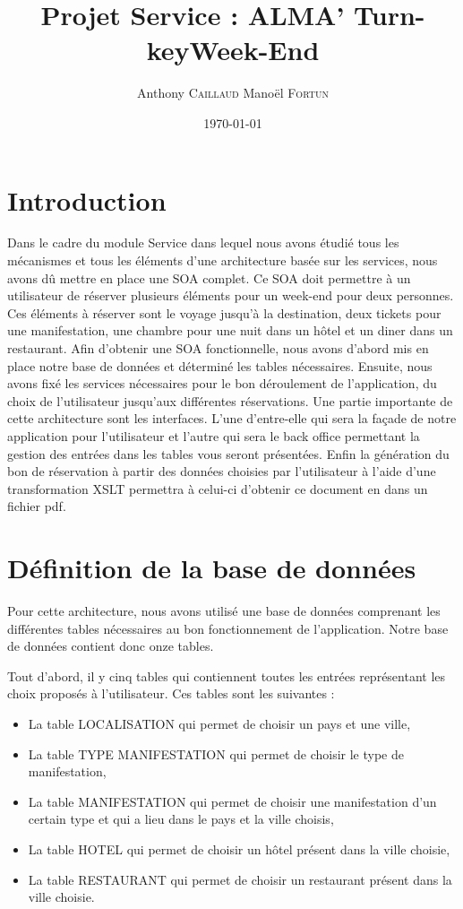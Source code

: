 \documentclass[11pt,a4paper]{article}
\title{Projet Service : ALMA' Turn-keyWeek-End}
\author{Anthony \textsc{Caillaud} Manoël \textsc{Fortun}}
\date{\today}
\begin{document}
\maketitle


\clearpage
\tableofcontents
\clearpage
\section{Introduction}

Dans le cadre du module Service dans lequel nous avons étudié tous les
mécanismes et tous les éléments d'une architecture basée sur les services, nous
avons dû mettre en place une SOA complet. Ce SOA doit permettre à un utilisateur
de réserver plusieurs éléments pour un week-end pour deux personnes. Ces
éléments à réserver sont le voyage jusqu'à la destination, deux tickets pour
une manifestation, une chambre pour une nuit dans un hôtel et un diner dans un
restaurant. Afin d'obtenir une SOA fonctionnelle, nous avons d'abord mis en
place notre base de données et déterminé les tables nécessaires. Ensuite, nous
avons fixé les services nécessaires pour le bon déroulement de l'application, du
choix de l'utilisateur jusqu'aux différentes réservations. Une partie
importante de cette architecture sont les interfaces. L'une
d'entre-elle qui sera la façade de notre application pour l'utilisateur et
l'autre qui sera le back office permettant la gestion des entrées dans les
tables vous seront présentées. Enfin la génération du bon de réservation à
partir des données choisies par l'utilisateur à l'aide d'une transformation
XSLT permettra à celui-ci d'obtenir ce document en dans un fichier pdf.


\section{Définition de la base de données}
Pour cette architecture, nous avons utilisé une base de données comprenant les
différentes tables nécessaires au bon fonctionnement de l'application. Notre
base de données contient donc onze tables. 

Tout d'abord, il y cinq tables qui contiennent toutes les entrées représentant
les choix proposés à l'utilisateur. Ces tables sont les suivantes :\\

\begin{itemize}
  \item La table LOCALISATION qui permet de choisir un pays et une ville,
  \item La table TYPE MANIFESTATION qui permet de choisir le type de
  manifestation,
  \item La table MANIFESTATION qui permet de choisir une manifestation d'un
  certain type et qui a lieu dans le pays et la ville choisis,
  \item La table HOTEL qui permet de choisir un hôtel présent dans la ville
  choisie,
  \item La table RESTAURANT qui permet de choisir un restaurant présent dans la
  ville choisie.\\
\end{itemize}
 
\end{document}
